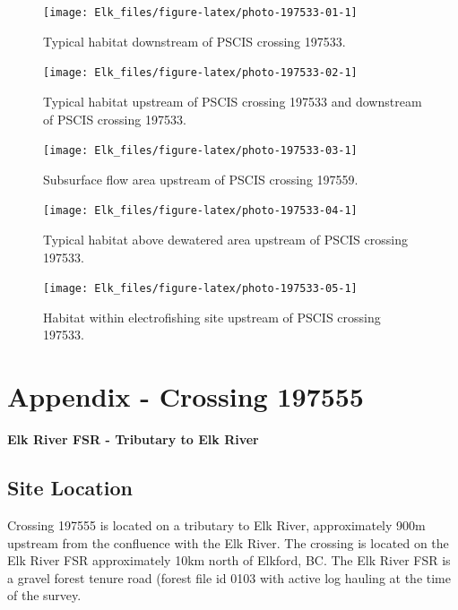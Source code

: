 \documentclass[
]{book}
\begin{document}
\begin{figure}[!ht]
\texttt{[image: Elk\_files/figure-latex/photo-197533-01-1]} \caption{Typical habitat downstream of PSCIS crossing 197533.}\label{fig:photo-197533-01}
\end{figure}

\begin{figure}[!ht]
\texttt{[image: Elk\_files/figure-latex/photo-197533-02-1]} \caption{Typical habitat upstream of PSCIS crossing 197533 and downstream of PSCIS crossing 197533.}\label{fig:photo-197533-02}
\end{figure}

\begin{figure}[!ht]
\texttt{[image: Elk\_files/figure-latex/photo-197533-03-1]} \caption{Subsurface flow area upstream of PSCIS crossing 197559.}\label{fig:photo-197533-03}
\end{figure}

\begin{figure}[!ht]
\texttt{[image: Elk\_files/figure-latex/photo-197533-04-1]} \caption{Typical habitat above dewatered area upstream of PSCIS crossing 197533.}\label{fig:photo-197533-04}
\end{figure}

\begin{figure}[!ht]
\texttt{[image: Elk\_files/figure-latex/photo-197533-05-1]} \caption{Habitat within electrofishing site upstream of PSCIS crossing 197533.}\label{fig:photo-197533-05}
\end{figure}

\hypertarget{appendix---crossing-197555}{%
\chapter*{Appendix - Crossing 197555}\label{appendix---crossing-197555}}

\textbf{Elk River FSR - Tributary to Elk River}

\hypertarget{site-location-7}{%
\section*{Site Location}\label{site-location-7}}

Crossing 197555 is located on a tributary to Elk River, approximately 900m upstream from the confluence with the Elk River. The crossing is located on the Elk River FSR approximately 10km north of Elkford, BC. The Elk River FSR is a gravel forest tenure road (forest file id 0103 with active log hauling at the time of the survey.
\end{document}
